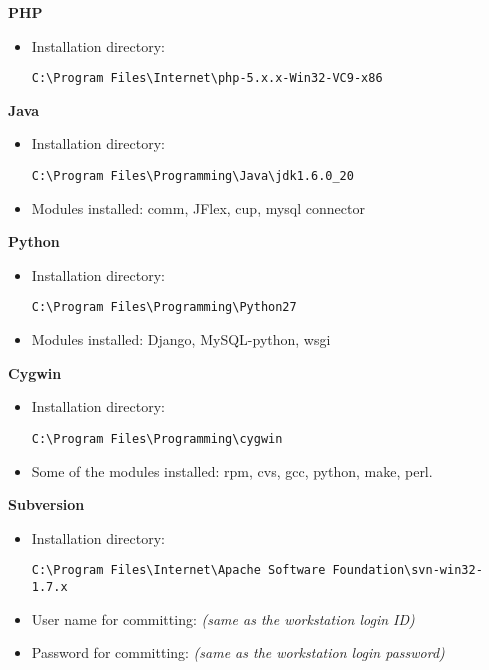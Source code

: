 \textbf{PHP}
\begin{itemize}
\item Installation directory: \begin{verbatim}C:\Program Files\Internet\php-5.x.x-Win32-VC9-x86\end{verbatim}
\end{itemize}
\textbf{Java}
\begin{itemize}
\item Installation directory: \begin{verbatim}C:\Program Files\Programming\Java\jdk1.6.0_20\end{verbatim}
\item Modules installed: comm, JFlex, cup, mysql connector
\end{itemize}
\textbf{Python}
\begin{itemize}
\item Installation directory: \begin{verbatim}C:\Program Files\Programming\Python27\end{verbatim}
\item Modules installed: Django, MySQL-python, wsgi
\end{itemize}
\textbf{Cygwin}
\begin{itemize}
\item Installation directory: \begin{verbatim}C:\Program Files\Programming\cygwin\end{verbatim}
\item Some of the modules installed: rpm, cvs, gcc, python, make, perl.
\end{itemize}
\textbf{Subversion}
\begin{itemize}
\item Installation directory: \begin{verbatim}C:\Program Files\Internet\Apache Software Foundation\svn-win32-1.7.x\end{verbatim}
\item User name for committing: \emph{(same as the workstation login ID)}
\item Password for committing: \emph{(same as the workstation login password)}
\end{itemize}